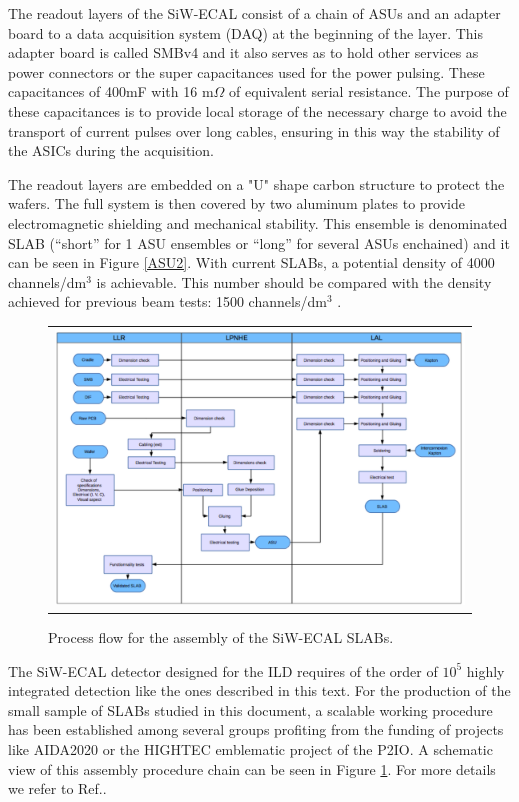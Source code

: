 \documentclass[final,3p,times,twocolumn]{elsarticle}
\begin{document}
The readout layers of the SiW-ECAL consist of a chain of ASUs and an adapter board
to a data acquisition system (DAQ) at the beginning of the layer.
This adapter board is called SMBv4
and it also serves as to hold other services as power connectors or the super capacitances used for the power pulsing. 
These capacitances of 400mF with 16 m$\Omega$ of equivalent serial resistance. 
The purpose of these capacitances is to provide local storage 
of the necessary charge to avoid the transport of current pulses over long cables, 
ensuring in this way the stability of the ASICs during the acquisition.

The readout layers are embedded on a "U" shape carbon structure to protect the wafers.
The full system is then covered by two aluminum plates
to provide electromagnetic shielding and mechanical stability.
This ensemble is denominated SLAB
(``short'' for 1 ASU ensembles or ``long'' for several ASUs enchained) and it can be seen in
Figure \ref{ASU2}.
With current SLABs, a potential density of
4000 channels/dm$^{3}$ is achievable. This number should be compared with
the density achieved for previous beam tests: 1500 channels/dm$^{3}$ \cite{Amjad:2014tha}.

\begin{figure}[!t]
\centering
\begin{tabular}{l}
\includegraphics[width=6.0in]{../figs/assembly.png} 
\end{tabular}
\caption{Process flow for the assembly of the SiW-ECAL SLABs.}
\label{assembly}
\end{figure}

The SiW-ECAL detector designed for the ILD requires of the order
of $10^{5}$ highly integrated detection like the ones described in this text.
For the production of the small sample of SLABs studied in this document,
a scalable working procedure has been established among several groups \cite{Boudry:2318814}
profiting from the funding of projects like AIDA2020 or the HIGHTEC emblematic project
of the P2IO. A schematic view of this assembly procedure chain can be seen in
Figure \ref{assembly}. For more details we refer to Ref.\cite{Boudry:2318814}.
\end{document}
